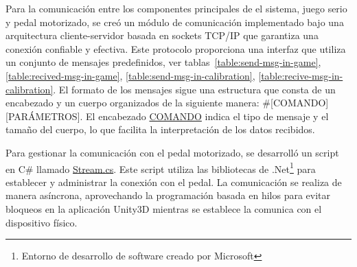 Para la comunicación entre los componentes principales de el sistema, juego serio y pedal motorizado, se creó un módulo de comunicación implementado bajo una arquitectura cliente-servidor basada en sockets TCP/IP que garantiza una conexión confiable y efectiva. Este protocolo proporciona una interfaz que utiliza un conjunto de mensajes predefinidos, ver tablas~\ref{table:send-msg-in-game}, \ref{table:recived-msg-in-game}, \ref{table:send-msg-in-calibration}, \ref{table:recive-msg-in-calibration}. El formato de los mensajes sigue una estructura que consta de un encabezado y un cuerpo organizados de la siguiente manera: \#[COMANDO][PARÁMETROS]. El encabezado \underline{COMANDO} indica el tipo de mensaje y el tamaño del cuerpo, lo que facilita la interpretación de los datos recibidos.

Para gestionar la comunicación con el pedal motorizado, se desarrolló un script en C\# llamado \underline{Stream.cs}. Este script utiliza las bibliotecas de .Net\footnote{Entorno de desarrollo de software creado por Microsoft} para establecer y administrar la conexión con el pedal. La comunicación se realiza de manera asíncrona, aprovechando la programación basada en hilos para evitar bloqueos en la aplicación Unity3D mientras se establece la comunica con el dispositivo físico.

